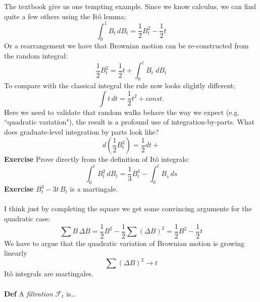 \documentclass[12pt]{article}
\begin{document}
{The textbook give us one tempting example.  Since we know calculus, we can find quite a few others using the It\^{o} lemma:
$$ \int_0^1 B_t \, dB_t = \frac{1}{2}B_t^2  - \frac{1}{2} t $$
Or a rearrangement we have that Brownian motion can be re-constructed from the random integral:
$$ \frac{1}{2}B_t^2 = \frac{1}{2} t  + \int_0^t B_t \; dB_t  $$
To compare with the classical integral the rule now looks slightly different;
$$ \int t \, dt = \frac{1}{2} t^2 + const. $$
Here we need to validate that random walks behave the way we expect (e.g. ``quadratic variation"), the result is a profound use of integration-by-parts.  What does graduate-level integration by parts look like?
$$ d( \frac{1}{2}B_t^2) = \frac{1}{2} dt +  $$
\textbf{Exercise} Prove directly from the definition of It\^{o} integrals:
$$ \int_0^t B_t^2 \, dB_t = \frac{1}{3} B_t^3  - \int_0^t B_s \, ds $$
\textbf{Exercise} $ B_t^3  - 3t \, B_t $ is a martingale. \\ \\
I think just by completing the square we get some convincing arguments for the quadratic case:
$$ \sum B \, \Delta B = \frac{1}{2}B^2  - \frac{1}{2} \sum (\Delta B)^2  = \frac{1}{2}B^2 - \frac{1}{2}t $$
We have to argue that the quadratic variation of Brownian motion is growing linearly 
$$\sum (\Delta B)^2 \to t$$
It\^{o} integrals are martingales. \\ \\
\textbf{Def} A \textit{filtration} $\mathcal{F}_t$ is\dots

\newpage 

}
\end{document}
